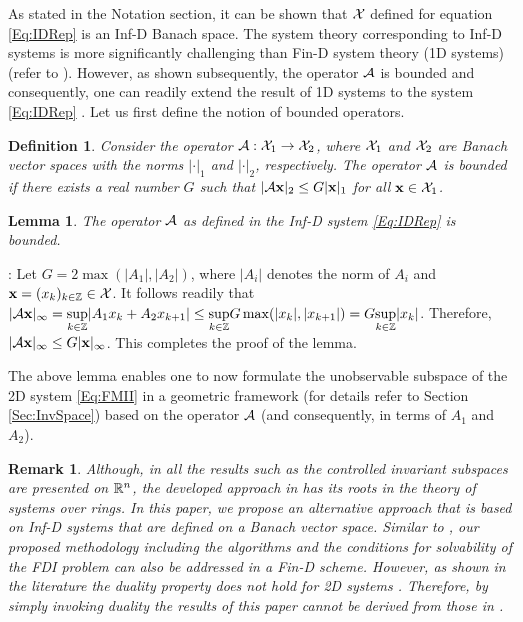 \documentclass[journal,12pt,draftcls,onecolumn]{IEEEtran}
\def\QEDclosed{\hfill\IEEEQEDclosed}
\renewcommand{\qed}{\QEDclosed}
\renewenvironment{proof}[1][\proofname]{\noindent\nobreakspace{\bfseries #1}:\;}{\qed\par}
\newtheorem{lemma}{Lemma}
\newtheorem{remark}{Remark}
\newtheorem{definition}{Definition}
\begin{document}
As stated in the Notation section, it can be  shown that $\mathcal{X}$ defined for equation \eqref{Eq:IDRep} is an Inf-D Banach space. The system theory corresponding to Inf-D systems is more significantly challenging than Fin-D system theory (1D systems) (refer to \cite{Zwart_Book}). However, as shown subsequently, the operator $\mathcal{A}$ is bounded and consequently, one can readily extend the result of 1D systems to the system \eqref{Eq:IDRep} \cite{Curtain_Book,Zwart_Book}. Let us first define the notion of bounded operators.
\begin{definition}\label{{Def:BoundedOp}}\cite{Curtain_Book}
	Consider the operator $\mathcal{A}:\mathcal{X}_1\rightarrow\mathcal{X}_2$, where $\mathcal{X}_1$ and $\mathcal{X}_2$ are Banach vector spaces  with the norms $|\cdot|_1$ and $|\cdot|_2$, respectively. The operator $\mathcal{A}$ is bounded if there exists a real number $G$ such that $|\mathcal{A}{\bf x}|_2\leq G|{\bf x}|_1$ for all ${\bf x}\in\mathcal{X}_1$.
\end{definition}
\begin{lemma}\label{Lem:Boundedness}
	The operator $\mathcal{A}$ as defined in the Inf-D system \eqref{Eq:IDRep} is bounded.
\end{lemma}
\begin{proof}
	Let $G = 2\max(|A_1|,|A_2|)$, where $|A_i|$ denotes the norm of $A_i$ and ${\bf x}=(x_k)_{k\in\mathbb{Z}}\in\mathcal{X}$. It follows readily that $|\mathcal{A}{\bf x}|_\infty=\underset{k\in\mathbb{Z}}{\text{sup}} |A_1x_k+A_2x_{k+1}|\leq\underset{k\in\mathbb{Z}}{\text{sup}} G \max(|x_k|,|x_{k+1}|)=G \underset{k\in\mathbb{Z}}{\text{sup}} |x_k|$.
	Therefore, $|\mathcal{A}{\bf x}|_\infty\leq G|{\bf x}|_\infty$. This completes the proof of the lemma.
\end{proof}
The above lemma enables one to now formulate the unobservable subspace of the 2D system \eqref{Eq:FMII} in a geometric framework (for details refer to Section \ref{Sec:InvSpace}) based on the operator $\mathcal{A}$ (and consequently, in terms of $A_1$ and $A_2$).


\begin{remark}
	 Although, in \cite{conte1988GeometryArticle} all the results such as the controlled invariant subspaces are presented on $\mathbb{R}^n$, the developed approach in \cite{conte1988GeometryArticle} has its roots in the theory of systems over rings. In this paper, we propose an alternative approach that is based on Inf-D systems that are  defined on a Banach vector space. Similar to \cite{conte1988GeometryArticle}, our proposed methodology including the algorithms and the conditions for solvability of the FDI problem can also be addressed in a Fin-D scheme. However, as shown in the literature the duality property does not hold for 2D systems \cite{FMMinimalRealization,FMinBook}. Therefore, by simply invoking duality the results of this paper cannot be derived from those in \cite{conte1988GeometryArticle}.
\end{remark}
\end{document}
